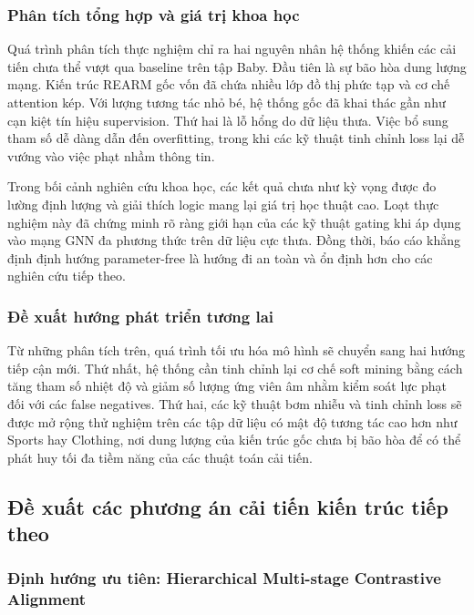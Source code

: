 \begin{longtable}
\subsubsection{Phân tích tổng hợp và giá trị khoa học}

Quá trình phân tích thực nghiệm chỉ ra hai nguyên nhân hệ thống khiến các cải tiến chưa thể vượt qua baseline trên tập Baby. Đầu tiên là sự bão hòa dung lượng mạng. Kiến trúc REARM gốc vốn đã chứa nhiều lớp đồ thị phức tạp và cơ chế attention kép. Với lượng tương tác nhỏ bé, hệ thống gốc đã khai thác gần như cạn kiệt tín hiệu supervision. Thứ hai là lỗ hổng do dữ liệu thưa. Việc bổ sung tham số dễ dàng dẫn đến overfitting, trong khi các kỹ thuật tinh chỉnh loss lại dễ vướng vào việc phạt nhầm thông tin.

Trong bối cảnh nghiên cứu khoa học, các kết quả chưa như kỳ vọng được đo lường định lượng và giải thích logic mang lại giá trị học thuật cao. Loạt thực nghiệm này đã chứng minh rõ ràng giới hạn của các kỹ thuật gating khi áp dụng vào mạng GNN đa phương thức trên dữ liệu cực thưa. Đồng thời, báo cáo khẳng định định hướng parameter-free là hướng đi an toàn và ổn định hơn cho các nghiên cứu tiếp theo.

\subsubsection{Đề xuất hướng phát triển tương lai}

Từ những phân tích trên, quá trình tối ưu hóa mô hình sẽ chuyển sang hai hướng tiếp cận mới. Thứ nhất, hệ thống cần tinh chỉnh lại cơ chế soft mining bằng cách tăng tham số nhiệt độ và giảm số lượng ứng viên âm nhằm kiểm soát lực phạt đối với các false negatives. Thứ hai, các kỹ thuật bơm nhiễu và tinh chỉnh loss sẽ được mở rộng thử nghiệm trên các tập dữ liệu có mật độ tương tác cao hơn như Sports hay Clothing, nơi dung lượng của kiến trúc gốc chưa bị bão hòa để có thể phát huy tối đa tiềm năng của các thuật toán cải tiến.


\subsection{Đề xuất các phương án cải tiến kiến trúc tiếp theo}

\subsubsection{Định hướng ưu tiên: Hierarchical Multi-stage Contrastive Alignment}


\end{longtable}
